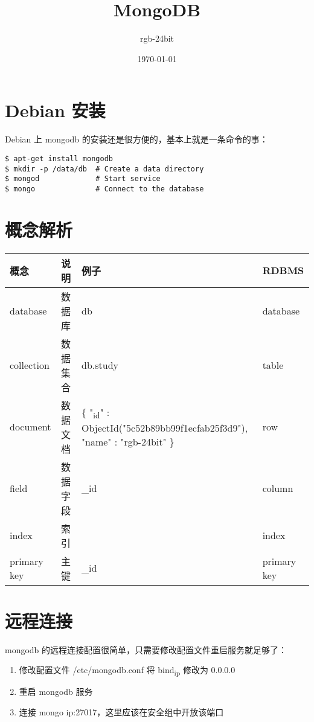 \documentclass[11pt]{article}
\author{rgb-24bit}
\date{\today}
\title{MongoDB}
\begin{document}
\maketitle
\tableofcontents


\section{Debian 安装}
\label{sec:org4c0b8d2}
Debian 上 mongodb 的安装还是很方便的，基本上就是一条命令的事：
\begin{verbatim}
$ apt-get install mongodb
$ mkdir -p /data/db  # Create a data directory
$ mongod             # Start service
$ mongo              # Connect to the database
\end{verbatim}

\section{概念解析}
\label{sec:org4626995}
\begin{center}
\begin{tabular}{llll}
\hline
概念 & 说明 & 例子 & RDBMS\\
\hline
database & 数据库 & db & database\\
collection & 数据集合 & db.study & table\\
document & 数据文档 & \{ "\textsubscript{id}" : ObjectId("5c52b89bb99f1ecfab25f3d9"), "name" : "rgb-24bit" \} & row\\
field & 数据字段 & \_id & column\\
index & 索引 &  & index\\
primary key & 主键 & \_id & primary key\\
\hline
\end{tabular}
\end{center}

\section{远程连接}
\label{sec:orgf66ec77}
mongodb 的远程连接配置很简单，只需要修改配置文件重启服务就足够了：
\begin{enumerate}
\item 修改配置文件 /etc/mongodb.conf 将 bind\textsubscript{ip} 修改为 0.0.0.0
\item 重启 mongodb 服务
\item 连接 mongo ip:27017，这里应该在安全组中开放该端口
\end{enumerate}
\end{document}
